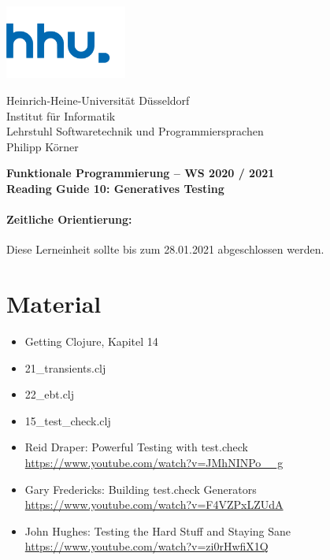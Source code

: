 \documentclass[11pt,a4paper]{article}
\theoremstyle{break}
\begin{document}
\begin{minipage}[b]{\textwidth}
\parbox[t]{5cm}{%
\includegraphics[width=4cm]{unilogo}
\hfill
}
\parbox[b]{11cm}{%
Heinrich-Heine-Universit\"at D\"usseldorf\\
Institut f\"ur Informatik\\
Lehrstuhl Softwaretechnik und Programmiersprachen\\
Philipp K\"orner
}

\end{minipage}
\begin{center}
\bf
Funktionale Programmierung -- WS 2020 / 2021\\
Reading Guide 10: Generatives Testing
\end{center}

\pagestyle{empty}

\paragraph{Zeitliche Orientierung:} Diese Lerneinheit sollte bis zum 28.01.2021 abgeschlossen werden.

\section{Material} 

\begin{itemize}
    \item Getting Clojure, Kapitel 14
\item 21\_transients.clj
\item 22\_ebt.clj
\item 15\_test\_check.clj
\item Reid Draper: Powerful Testing with test.check \url{https://www.youtube.com/watch?v=JMhNINPo__g}
\item Gary Fredericks: Building test.check Generators \url{https://www.youtube.com/watch?v=F4VZPxLZUdA}
\item John Hughes: Testing the Hard Stuff and Staying Sane \url{https://www.youtube.com/watch?v=zi0rHwfiX1Q}
\end{itemize}
\end{document}
